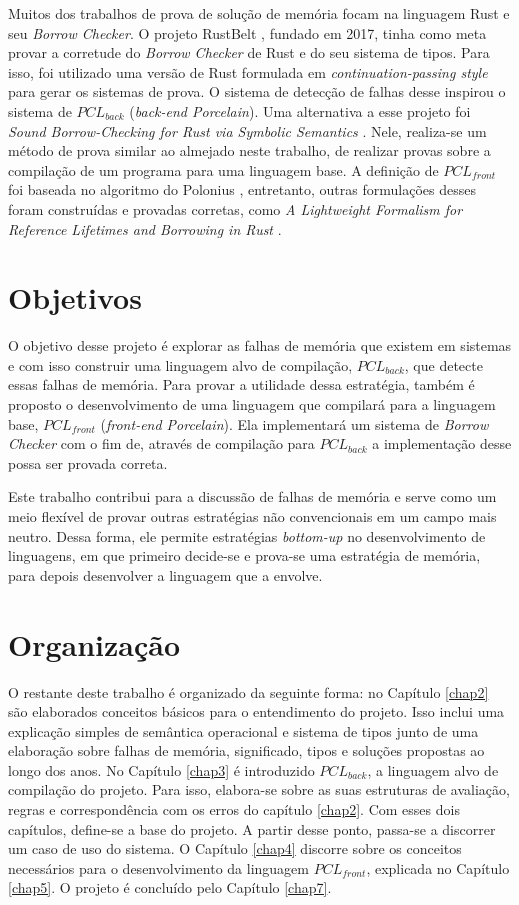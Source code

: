 Muitos dos trabalhos de prova de solução de memória focam na linguagem Rust e seu \emph{Borrow Checker}. O projeto RustBelt \cite{RUSTBELT}, fundado em 2017, tinha como meta provar a corretude do \emph{Borrow Checker} de Rust e do seu sistema de tipos. Para isso, foi utilizado uma versão de Rust formulada em \emph{continuation-passing style} para gerar os sistemas de prova. O sistema de detecção de falhas desse inspirou o sistema de $PCL_{back}$ (\emph{back-end Porcelain}). Uma alternativa a esse projeto foi \emph{Sound Borrow-Checking for Rust via Symbolic Semantics} \cite{RUSTSYMBOLIC}. Nele, realiza-se um método de prova similar ao almejado neste trabalho, de realizar provas sobre a compilação de um programa para uma linguagem base. A definição de $PCL_{front}$ foi baseada no algoritmo do Polonius \cite{Stjerna1684081}, entretanto, outras formulações desses foram construídas e provadas corretas, como \emph{A Lightweight Formalism for Reference Lifetimes and Borrowing in Rust} \cite{RUSTFORMALISM}. 

\section{Objetivos}

O objetivo desse projeto é explorar as falhas de memória que existem em sistemas e com isso construir uma linguagem alvo de compilação, $PCL_{back}$, que detecte essas falhas de memória. Para provar a utilidade dessa estratégia, também é proposto o desenvolvimento de uma linguagem que compilará para a linguagem base, $PCL_{front}$ (\emph{front-end Porcelain}). Ela implementará um sistema de \emph{Borrow Checker} com o fim de, através de compilação para $PCL_{back}$ a implementação desse possa ser provada correta.

Este trabalho contribui para a discussão de falhas de memória e serve como um meio flexível de provar outras estratégias não convencionais em um campo mais neutro. Dessa forma, ele permite estratégias \emph{bottom-up} no desenvolvimento de linguagens, em que primeiro decide-se e prova-se uma estratégia de memória, para depois desenvolver a linguagem que a envolve.

\section{Organização}

O restante deste trabalho é organizado da seguinte forma: no Capítulo \ref{chap2} são elaborados conceitos básicos para o entendimento do projeto. Isso inclui uma explicação simples de semântica operacional e sistema de tipos junto de uma elaboração sobre falhas de memória, significado, tipos e soluções propostas ao longo dos anos. No Capítulo \ref{chap3} é introduzido $PCL_{back}$, a linguagem alvo de compilação do projeto. Para isso, elabora-se sobre as suas estruturas de avaliação, regras e correspondência com os erros do capítulo \ref{chap2}. Com esses dois capítulos, define-se a base do projeto. A partir desse ponto, passa-se a discorrer um caso de uso do sistema. O Capítulo \ref{chap4} discorre sobre os conceitos necessários para o desenvolvimento da linguagem $PCL_{front}$, explicada no Capítulo \ref{chap5}. O projeto é concluído pelo Capítulo \ref{chap7}.
